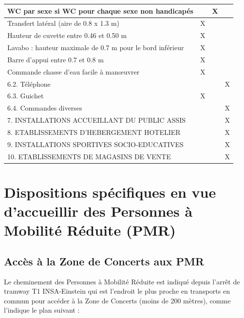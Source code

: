 \documentclass[hidelinks, paper=a4, fontsize=13pt]{report}
\begin{document}
\begin{center}
\begin{tabular}{ | p{13cm} | p{1cm} | p{1cm} | p{1cm} | }
	WC par sexe si WC pour chaque sexe non handicapés &  & X &  \\ \hline
	Transfert latéral (aire de 0.8 x 1.3 m) & X &  &  \\ \hline
	Hauteur de cuvette entre 0.46 et 0.50 m & X &  &  \\ \hline
	Lavabo : hauteur maximale de 0.7 m pour le bord inférieur & X &  &  \\ \hline
	Barre d’appui entre 0.7 et 0.8 m & X &  &  \\ \hline
	Commande chasse d’eau facile à manœuvrer & X &  &  \\ \hline
	6.2. Téléphone &  &  & X \\ \hline
	6.3. Guichet & X &  &  \\ \hline
	6.4. Commandes diverses &  &  & X \\ \hline
	7. INSTALLATIONS ACCUEILLANT DU PUBLIC ASSIS &  &  & X \\ \hline
	8. ETABLISSEMENTS D’HEBERGEMENT HOTELIER &  &  & X \\ \hline
	9. INSTALLATIONS SPORTIVES SOCIO-EDUCATIVES &  &  & X \\ \hline
	10. ETABLISSEMENTS DE MAGASINS DE VENTE &  &  & X \\ \hline
\end{tabular}

\end{center}
\newpage
\section{Dispositions spécifiques en vue d’accueillir des Personnes à Mobilité Réduite (PMR)}

\subsection{Accès à la Zone de Concerts aux PMR}

Le cheminement des Personnes à Mobilité Réduite est indiqué depuis l’arrêt de tramway T1 INSA-Einstein qui est l’endroit le plus proche en transports en commun pour accéder à la Zone de Concerts (moins de 200 mètres), comme l’indique le plan suivant :
\end{document}
